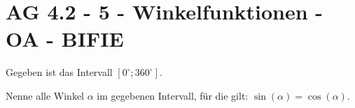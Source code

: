 \section{AG 4.2 - 5 - Winkelfunktionen - OA - BIFIE}

\begin{beispiel}[AG 4.2]{1} %
Gegeben ist das Intervall $\left[0^\circ; 360^\circ\right]$.

Nenne alle Winkel $\alpha$ im gegebenen Intervall, für die gilt: $\sin(\alpha)=\cos(\alpha)$.
\leer

\end{beispiel}